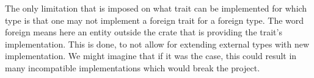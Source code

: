 
%
%
%    

The only limitation that is imposed on what trait can be implemented for which type is that one may not implement a foreign trait for a foreign type. The word foreign means here an entity outside the crate that is providing the trait's implementation. This is done, to not allow for extending external types with new implementation. We might imagine that if it was the case, this could result in many incompatible implementations which would break the project.

